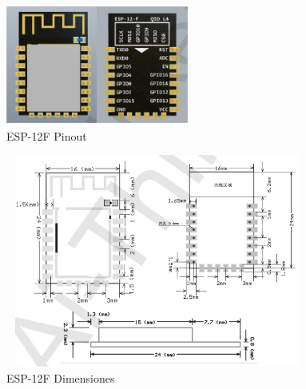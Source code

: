     
    \begin{figure}[H]
        \centering
        \includegraphics[width=6cm, height=4cm]{imagenes/esp-12F pinout.jpg}
        \caption{ESP-12F Pinout}
        \label{imag:esp-12F_pinout}
    \end{figure}

    \begin{figure}[H]
        \centering
        \includegraphics[width=10cm, height=7cm]{imagenes/esp-12F dimensiones.jpg}
        \caption{ESP-12F Dimensiones}
        \label{imag:esp-12F_dimensiones}
    \end{figure}

    \vspace{4cm}


    
    

